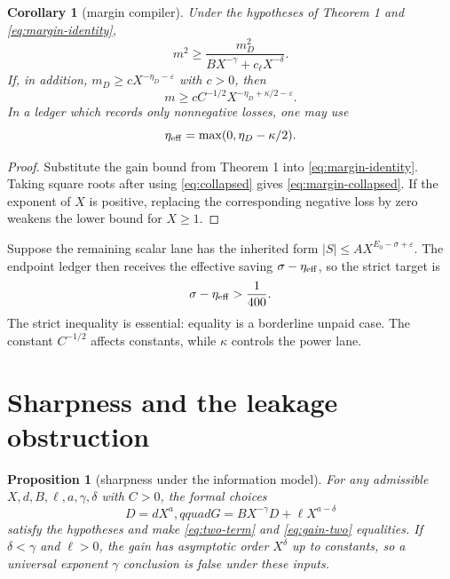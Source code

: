 \documentclass[11pt]{article}
\newtheorem{corollary}[theorem]{Corollary}
\newtheorem{proposition}[theorem]{Proposition}
\begin{document}
\begin{corollary}[margin compiler]
Under the hypotheses of Theorem 1 and \eqref{eq:margin-identity},
\begin{equation}
 m^2\ge
 \frac{m_D^2}{B X^{-\gamma}+c_\ell X^{-\delta}}.
 \label{eq:margin-two}
\end{equation}
If, in addition, $m_D\ge cX^{-\eta_D-\varepsilon}$ with $c>0$, then
\begin{equation}
 m\ge c C^{-1/2}X^{-\eta_D+\kappa/2-\varepsilon}.
 \label{eq:margin-collapsed}
\end{equation}
In a ledger which records only nonnegative losses, one may use
\[
 \eta_{\rm eff}=\max(0,\eta_D-\kappa/2).
\]
\end{corollary}

\begin{proof}
Substitute the gain bound from Theorem 1 into \eqref{eq:margin-identity}.
Taking square roots after using \eqref{eq:collapsed} gives
\eqref{eq:margin-collapsed}.  If the exponent of $X$ is positive, replacing
the corresponding negative loss by zero weakens the lower bound for $X\ge1$.
\end{proof}

Suppose the remaining scalar lane has the inherited form
$|S|\le A X^{E_0-\sigma+\varepsilon}$.  The endpoint ledger then receives
the effective saving $\sigma-\eta_{\rm eff}$, so the strict target is
\begin{equation}
 \sigma-\eta_{\rm eff}>\frac1{400}.
 \label{eq:endpoint}
\end{equation}
The strict inequality is essential: equality is a borderline unpaid case.
The constant $C^{-1/2}$ affects constants, while $\kappa$ controls the power
lane.

\section{Sharpness and the leakage obstruction}

\begin{proposition}[sharpness under the information model]
For any admissible $X,d,B,\ell,a,\gamma,\delta$ with $C>0$, the formal
choices
\[
 D=dX^a,qquad
 G=B X^{-\gamma}D+\ell X^{a-\delta}
\]
satisfy the hypotheses and make \eqref{eq:two-term} and \eqref{eq:gain-two}
equalities.  If $\delta<\gamma$ and $\ell>0$, the gain has asymptotic order
$X^\delta$ up to constants, so a universal exponent $\gamma$ conclusion is
false under these inputs.
\end{proposition}
\end{document}
